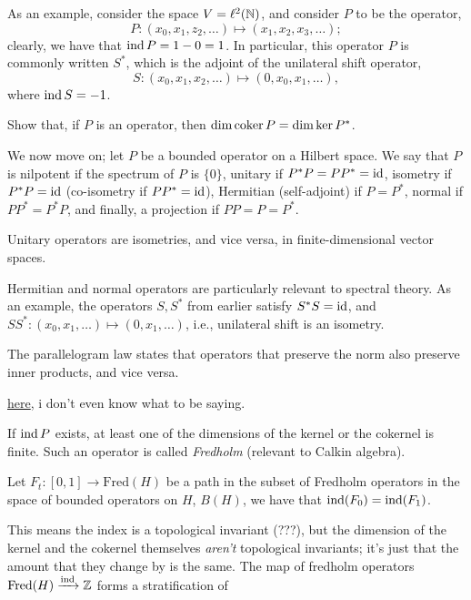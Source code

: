 As an example, consider the space $V = \ell^2(\mathbb N)$, and consider $P$ to be the operator,
\[ P : (x_0, x_1, z_2, \dots) \mapsto (x_1, x_2, x_3, \dots); \]
clearly, we have that $\operatorname{ind} P = 1 - 0 = 1$. In particular, this operator $P$ is commonly written $S^\ast$, which is the adjoint of the unilateral shift operator,
\[ S : (x_0, x_1, x_2, \dots) \mapsto (0, x_0, x_1, \dots), \]
where $\operatorname{ind} S = -1$.
\begin{exercise}
    Show that, if $P$ is an operator, then $\dim \operatorname{coker} P = \dim \ker P^\ast$.
\end{exercise}
\noindent We now move on; let $P$ be a bounded operator on a Hilbert space. We say that $P$ is nilpotent if the spectrum of $P$ is $\{0\}$, unitary if $P^\ast P = P P^\ast = \mathrm{id}$, isometry if $P^\ast P = \mathrm{id}$ (co-isometry if $P P^\ast = \mathrm{id}$), Hermitian (self-adjoint) if $P = P^\ast$, normal if $P P^\ast = P^\ast P$, and finally, a projection if $PP = P = P^\ast$.
\begin{exercise}
    Unitary operators are isometries, and vice versa, in finite-dimensional vector spaces.
\end{exercise}
\noindent Hermitian and normal operators are particularly relevant to spectral theory. As an example, the operators $S, S^\ast$ from earlier satisfy $S^\ast S = \mathrm{id}$, and $S S^\ast : (x_0, x_1, \dots) \mapsto (0, x_1, \dots)$, i.e., unilateral shift is an isometry.
\begin{lemma}
    The parallelogram law states that operators that preserve the norm also preserve inner products, and vice versa.
\end{lemma}
\begin{lemma}
    \href{https://en.wikipedia.org/wiki/Wold%27s_decomposition}{here}, i don't even know what to be saying.
\end{lemma}
\noindent If $\operatorname{ind} P$ exists, at least one of the dimensions of the kernel or the cokernel is finite. Such an operator is called \textit{Fredholm} (relevant to Calkin algebra).
\begin{theorem}
    Let $F_t : [0, 1] \to \mathrm{Fred}(H)$ be a path in the subset of Fredholm operators in the space of bounded operators on $H$, $B(H)$, we have that $\operatorname{ind}(F_0) = \operatorname{ind}(F_1)$.
\end{theorem}
\noindent This means the index is a topological invariant (???), but the dimension of the kernel and the cokernel themselves \textit{aren't} topological invariants; it's just that the amount that they change by is the same. The map of fredholm operators $\operatorname{Fred}(H) \xrightarrow{\operatorname{ind}} \mathbb Z$ forms a stratification of
